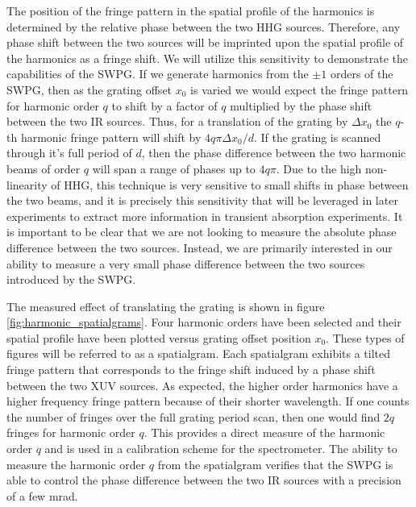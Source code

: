 The position of the fringe pattern in the spatial profile of the harmonics is determined by the relative phase between the two HHG sources.  Therefore, any phase shift between the two sources will be imprinted upon the spatial profile of the harmonics as a fringe shift.  We will utilize this sensitivity to demonstrate the capabilities of the SWPG.  If we generate harmonics from the $\pm1$ orders of the SWPG, then as the grating offset $x_0$ is varied we would expect the fringe pattern for harmonic order $q$ to shift by a factor of $q$ multiplied by the phase shift between the two IR sources. Thus, for a translation of the grating by $\Delta x_0$ the $q$-th harmonic fringe pattern will shift by $4q\pi\Delta x_0/d$.  If the grating is scanned through it's full period of $d$, then the phase difference between the two harmonic beams of order $q$ will span a range of phases up to $4q\pi$.  Due to the high  non-linearity of HHG, this technique is very sensitive to small shifts in phase between the two beams, and it is precisely this sensitivity that will be leveraged in later experiments to extract more information in transient absorption experiments.  It is important to be clear that we are not looking to measure the absolute phase difference between the two sources.  Instead, we are primarily interested in our ability to measure a very small phase difference between the two sources introduced by the SWPG.

The measured effect of translating the grating is shown in figure \ref{fig:harmonic_spatialgrams}. Four harmonic orders have been selected and their spatial profile have been plotted versus grating offset position $x_0$.  These types of figures will be referred to as a spatialgram. Each spatialgram exhibits a tilted fringe pattern that corresponds to the fringe shift induced by a phase shift between the two XUV sources.  As expected, the higher order harmonics have a higher frequency fringe pattern because of their shorter wavelength.  If one counts the number of fringes over the full grating period scan, then one would find $2q$ fringes for harmonic order $q$. This provides a direct measure of the harmonic order $q$ and is used in a calibration scheme for the spectrometer.  The ability to measure the harmonic order $q$ from the spatialgram verifies that the SWPG is able to control the phase difference between the two IR sources with a precision of a few mrad.

